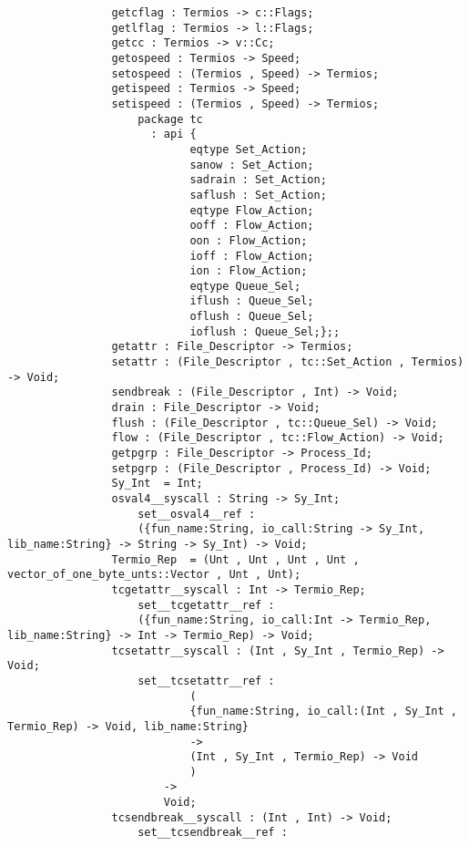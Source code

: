 \begin{verbatim}
                getcflag : Termios -> c::Flags;
                getlflag : Termios -> l::Flags;
                getcc : Termios -> v::Cc;
                getospeed : Termios -> Speed;
                setospeed : (Termios , Speed) -> Termios;
                getispeed : Termios -> Speed;
                setispeed : (Termios , Speed) -> Termios;
                    package tc
                      : api {
                            eqtype Set_Action;
                            sanow : Set_Action;
                            sadrain : Set_Action;
                            saflush : Set_Action;
                            eqtype Flow_Action;
                            ooff : Flow_Action;
                            oon : Flow_Action;
                            ioff : Flow_Action;
                            ion : Flow_Action;
                            eqtype Queue_Sel;
                            iflush : Queue_Sel;
                            oflush : Queue_Sel;
                            ioflush : Queue_Sel;};;
                getattr : File_Descriptor -> Termios;
                setattr : (File_Descriptor , tc::Set_Action , Termios) -> Void;
                sendbreak : (File_Descriptor , Int) -> Void;
                drain : File_Descriptor -> Void;
                flush : (File_Descriptor , tc::Queue_Sel) -> Void;
                flow : (File_Descriptor , tc::Flow_Action) -> Void;
                getpgrp : File_Descriptor -> Process_Id;
                setpgrp : (File_Descriptor , Process_Id) -> Void;
                Sy_Int  = Int;
                osval4__syscall : String -> Sy_Int;
                    set__osval4__ref :
                    ({fun_name:String, io_call:String -> Sy_Int, lib_name:String} -> String -> Sy_Int) -> Void;
                Termio_Rep  = (Unt , Unt , Unt , Unt , vector_of_one_byte_unts::Vector , Unt , Unt);
                tcgetattr__syscall : Int -> Termio_Rep;
                    set__tcgetattr__ref :
                    ({fun_name:String, io_call:Int -> Termio_Rep, lib_name:String} -> Int -> Termio_Rep) -> Void;
                tcsetattr__syscall : (Int , Sy_Int , Termio_Rep) -> Void;
                    set__tcsetattr__ref :
                            (
                            {fun_name:String, io_call:(Int , Sy_Int , Termio_Rep) -> Void, lib_name:String}
                            ->
                            (Int , Sy_Int , Termio_Rep) -> Void
                            )
                        ->
                        Void;
                tcsendbreak__syscall : (Int , Int) -> Void;
                    set__tcsendbreak__ref :

\end{verbatim}
